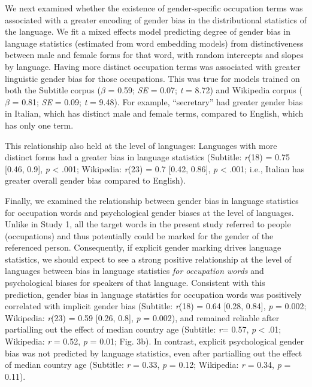 \documentclass[9pt,twocolumn,twoside,lineno]{pnas-new}
\begin{document}
We next examined whether the existence of gender-specific occupation terms was associated with a greater encoding of gender bias in the distributional statistics of the language. We fit a mixed effects model predicting degree of gender bias in language statistics (estimated from word embedding models) from distinctiveness between male and female forms for that word, with random intercepts and slopes by language. Having more distinct occupation terms was associated with greater linguistic gender bias for those occupations. This was true for models trained on both the Subtitle corpus (\(\beta\) = 0.59; \emph{SE} = 0.07; \emph{t} = 8.72) and Wikipedia
corpus (\(\beta\) = 0.81; \emph{SE} = 0.09; \emph{t} = 9.48). For example, \enquote{secretary} had greater gender bias in Italian, which has distinct male and female terms, compared to English, which has only one term. 

This relationship also held at the level of languages: Languages with more
distinct forms had a greater bias in language statistics
(Subtitle: \emph{r}(18) = 0.75 {[}0.46, 0.9{]}, \emph{p} \textless{} .001; Wikipedia: \emph{r}(23) = 0.7 {[}0.42, 0.86{]}, \emph{p} \textless{} .001; i.e., Italian has greater overall gender bias compared to English).

Finally, we examined the relationship between gender bias in language
statistics for occupation words and psychological gender biases at the level of languages.
Unlike in Study 1, all the target words in the present study referred to
people (occupations) and thus potentially could be marked for the gender
of the referenced person. Consequently, if explicit gender marking
drives language statistics, we should expect to see a strong positive
relationship at the level of languages between bias in language
statistics \emph{for occupation words} and psychological biases for
speakers of that language. Consistent with this prediction, gender bias
in language statistics for occupation words was positively correlated
with implicit gender bias (Subtitle: \emph{r}(18) = 0.64 {[}0.28, 0.84{]}, \emph{p} =  0.002; Wikipedia: \emph{r}(23) = 0.59 {[}0.26, 0.8{]}, \emph{p} = 0.002),
and remained reliable after partialling out the effect of median country
age (Subtitle: \emph{r}= 0.57, \emph{p} \textless{} .01; Wikipedia: \emph{r}  = 0.52, \emph{p} = 0.01; Fig. 3b). In contrast,  explicit psychological gender bias was not predicted by language statistics, even after partialling out the effect of median country age (Subtitle: \emph{r} = 0.33, \emph{p} = 0.12; Wikipedia:
\emph{r} = 0.34, \emph{p} = 0.11).
\end{document}
